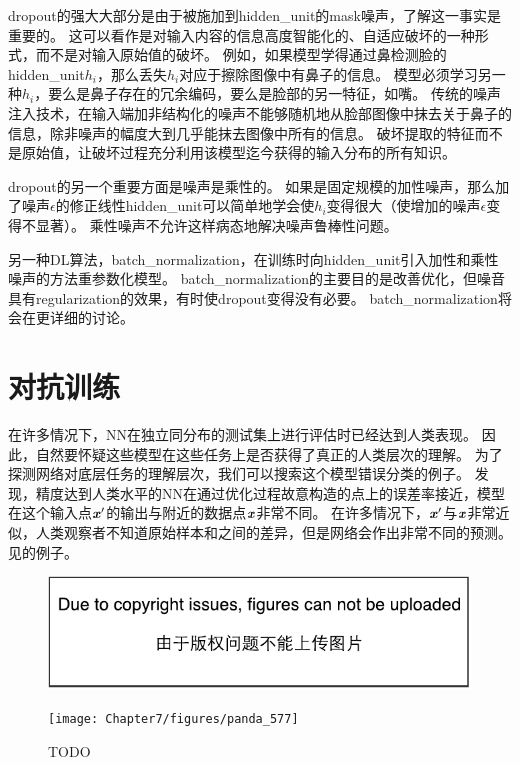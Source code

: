 \gls{dropout}的强大大部分是由于被施加到\gls{hidden_unit}的\gls{mask}噪声，了解这一事实是重要的。
这可以看作是对输入内容的信息高度智能化的、自适应破坏的一种形式，而不是对输入原始值的破坏。
例如，如果模型学得通过鼻检测脸的\gls{hidden_unit}$h_i$，那么丢失$h_i$对应于擦除图像中有鼻子的信息。
模型必须学习另一种$h_i$，要么是鼻子存在的冗余编码，要么是脸部的另一特征，如嘴。
传统的噪声注入技术，在输入端加非结构化的噪声不能够随机地从脸部图像中抹去关于鼻子的信息，除非噪声的幅度大到几乎能抹去图像中所有的信息。
破坏提取的特征而不是原始值，让破坏过程充分利用该模型迄今获得的输入分布的所有知识。

\gls{dropout}的另一个重要方面是噪声是乘性的。
如果是固定规模的加性噪声，那么加了噪声$\epsilon$的修正线性\gls{hidden_unit}可以简单地学会使$h_i$变得很大（使增加的噪声$\epsilon$变得不显著）。
乘性噪声不允许这样病态地解决噪声鲁棒性问题。


另一种\gls{DL}算法，\gls{batch_normalization}，在训练时向\gls{hidden_unit}引入加性和乘性噪声的方法重参数化模型。
\gls{batch_normalization}的主要目的是改善优化，但噪音具有\gls{regularization}的效果，有时使\gls{dropout}变得没有必要。
\gls{batch_normalization}将会在更详细的讨论。



\section{对抗训练}
\label{sec:adversarial_training}
在许多情况下，\gls{NN}在独立同分布的测试集上进行评估时已经达到人类表现。
因此，自然要怀疑这些模型在这些任务上是否获得了真正的人类层次的理解。
为了探测网络对底层任务的理解层次，我们可以搜索这个模型错误分类的例子。
\cite{Szegedy-ICLR2014}发现，精度达到人类水平的\gls{NN}在通过优化过程故意构造的点上的误差率接近，模型在这个输入点$\boldsymbol{\mathit{x}}'$的输出与附近的数据点$\boldsymbol{\mathit{x}}$非常不同。
在许多情况下，$\boldsymbol{\mathit{x}}'$与$\boldsymbol{\mathit{x}}$非常近似，人类观察者不知道原始样本和之间的差异，但是网络会作出非常不同的预测。
见的例子。
\begin{figure}[!htb]
\ifOpenSource
\centerline{\includegraphics{figure.pdf}}
\else
\centerline{\texttt{[image: Chapter7/figures/panda\_577]}}
\fi
\caption{TODO}
\label{fig:chap7_panda_577}
\end{figure}


